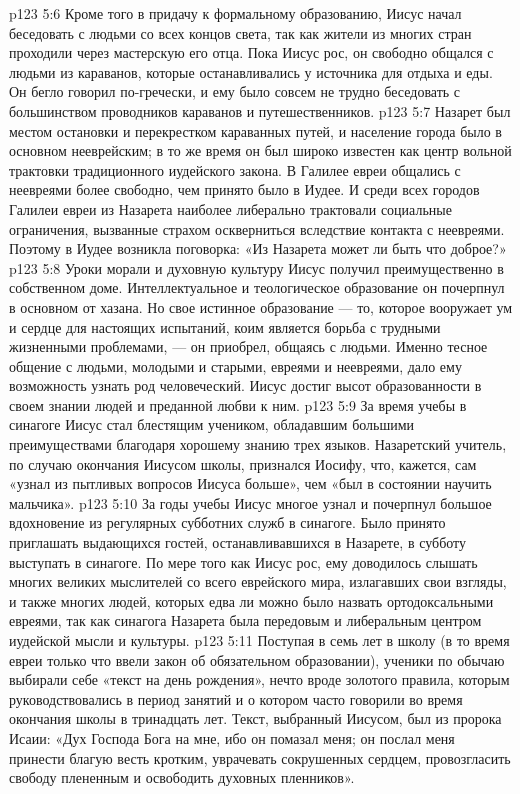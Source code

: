 \vs p123 5:6 \pc Кроме того в придачу к формальному образованию, Иисус начал беседовать с людьми со всех концов света, так как жители из многих стран проходили через мастерскую его отца. Пока Иисус рос, он свободно общался с людьми из караванов, которые останавливались у источника для отдыха и еды. Он бегло говорил по\hyp{}гречески, и ему было совсем не трудно беседовать с большинством проводников караванов и путешественников.
\vs p123 5:7 Назарет был местом остановки и перекрестком караванных путей, и население города было в основном нееврейским; в то же время он был широко известен как центр вольной трактовки традиционного иудейского закона. В Галилее евреи общались с неевреями более свободно, чем принято было в Иудее. И среди всех городов Галилеи евреи из Назарета наиболее либерально трактовали социальные ограничения, вызванные страхом оскверниться вследствие контакта с неевреями. Поэтому в Иудее возникла поговорка: «Из Назарета может ли быть что доброе?»
\vs p123 5:8 Уроки морали и духовную культуру Иисус получил преимущественно в собственном доме. Интеллектуальное и теологическое образование он почерпнул в основном от хазана. Но свое истинное образование --- то, которое вооружает ум и сердце для настоящих испытаний, коим является борьба с трудными жизненными проблемами, --- он приобрел, общаясь с людьми. Именно тесное общение с людьми, молодыми и старыми, евреями и неевреями, дало ему возможность узнать род человеческий. Иисус достиг высот образованности в своем знании людей и преданной любви к ним.
\vs p123 5:9 \pc За время учебы в синагоге Иисус стал блестящим учеником, обладавшим большими преимуществами благодаря хорошему знанию трех языков. Назаретский учитель, по случаю окончания Иисусом школы, признался Иосифу, что, кажется, сам «узнал из пытливых вопросов Иисуса больше», чем «был в состоянии научить мальчика».
\vs p123 5:10 За годы учебы Иисус многое узнал и почерпнул большое вдохновение из регулярных субботних служб в синагоге. Было принято приглашать выдающихся гостей, останавливавшихся в Назарете, в субботу выступать в синагоге. По мере того как Иисус рос, ему доводилось слышать многих великих мыслителей со всего еврейского мира, излагавших свои взгляды, и также многих людей, которых едва ли можно было назвать ортодоксальными евреями, так как синагога Назарета была передовым и либеральным центром иудейской мысли и культуры.
\vs p123 5:11 Поступая в семь лет в школу (в то время евреи только что ввели закон об обязательном образовании), ученики по обычаю выбирали себе «текст на день рождения», нечто вроде золотого правила, которым руководствовались в период занятий и о котором часто говорили во время окончания школы в тринадцать лет. Текст, выбранный Иисусом, был из пророка Исаии: «Дух Господа Бога на мне, ибо он помазал меня; он послал меня принести благую весть кротким, уврачевать сокрушенных сердцем, провозгласить свободу плененным и освободить духовных пленников».
